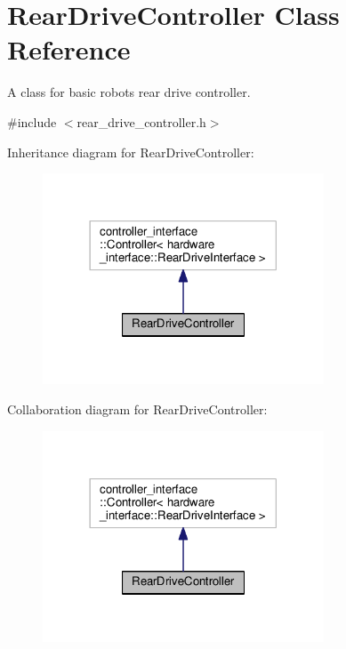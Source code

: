 \hypertarget{classRearDriveController}{}\section{Rear\+Drive\+Controller Class Reference}
\label{classRearDriveController}


A class for basic robot\textquotesingle{}s rear drive controller.  




{\ttfamily \#include $<$rear\+\_\+drive\+\_\+controller.\+h$>$}



Inheritance diagram for Rear\+Drive\+Controller\+:\nopagebreak
\begin{figure}[H]
\begin{center}
\leavevmode
\includegraphics[width=237pt]{classRearDriveController__inherit__graph}
\end{center}
\end{figure}


Collaboration diagram for Rear\+Drive\+Controller\+:\nopagebreak
\begin{figure}[H]
\begin{center}
\leavevmode
\includegraphics[width=237pt]{classRearDriveController__coll__graph}
\end{center}
\end{figure}
